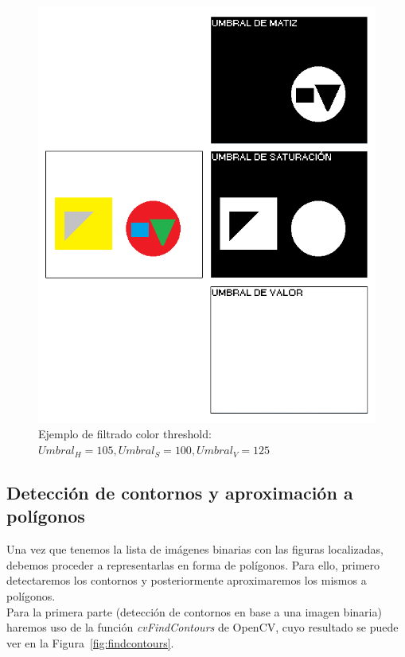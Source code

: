 {		\begin{figure}[!htbp]
		\centering
		\includegraphics[scale=0.47]{graphics/colorthreshold2.png}
		\caption{Ejemplo de filtrado color threshold: $Umbral_{H} = 105, Umbral_{S} = 100, Umbral_{V} = 125$}
		\label{fig:colorthres2}
		\end{figure}
	
	
	
	\subsection{Detección de contornos y aproximación a polígonos}
	\label{sec:deteccionContornos}
	
	Una vez que tenemos la lista de imágenes binarias con las figuras localizadas, debemos proceder a representarlas en forma de polígonos. Para ello, primero detectaremos los contornos y posteriormente aproximaremos los mismos a polígonos.\\
	
	Para la primera parte (detección de contornos en base a una imagen binaria) haremos uso de la función \emph{cvFindContours} de OpenCV, cuyo resultado se puede ver en la Figura~\ref{fig:findcontours}.\\
	
}
